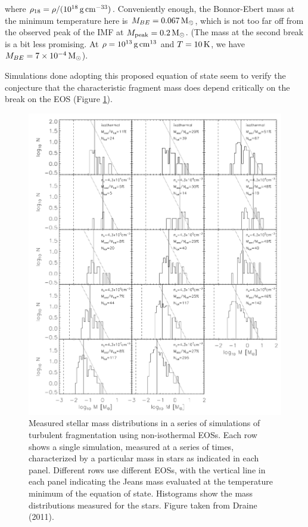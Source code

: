 \documentclass[a4paper,10pt]{article}
\begin{document}
{\noindent}where $\rho_{18}=\rho/(10^{18}\,{\rm g\,cm^{-33}})$. Conveniently enough, the Bonnor-Ebert mass at the minimum temperature here is $M_{BE}=0.067\,{\rm M_\odot}$, which is not too far off from the observed peak of the IMF at $M_\mathrm{peak}=0.2\,{\rm M_\odot}$. (The mass at the second break is a bit less promising. At $\rho=10^{13}\,{\rm g\,cm^{13}}$ and $T=10\,{\rm K}$, we have $M_{BE}=7\times10^{-4}\,{\rm M_\odot}$).

{\noindent}Simulations done adopting this proposed equation of state seem to verify the conjecture that the characteristic fragment mass does depend critically on the break on the EOS (Figure \ref{fig:imfmodels}).

\begin{figure}[t!]
    \centering
    \includegraphics[width=16cm]{figures/IMFmodels.png}
    \caption{\footnotesize{Measured stellar mass distributions in a series of simulations of turbulent fragmentation using non-isothermal EOSs. Each row shows a single simulation, measured at a series of times, characterized by a particular mass in stars as indicated in each panel. Different rows use different EOSs, with the vertical line in each panel indicating the Jeans mass evaluated at the temperature minimum of the equation of state. Histograms show the mass distributions measured for the stars. Figure taken from Draine (2011).}}
    \label{fig:imfmodels}
\end{figure}
\end{document}
